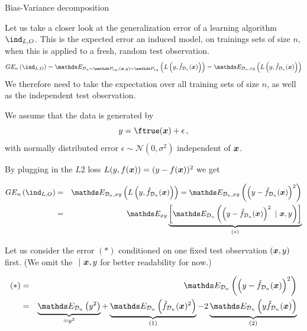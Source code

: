 \begin{vbframe} {Bias-Variance decomposition}

Let us take a closer look at the generalization error of a learning algorithm $\ind_{L, O}$.
This is the expected error an induced model, on trainings sets of size $n$, when this is applied to a fresh, random test observation.
  $$\GEind = \E_{\D_n \sim \Pxy, (\xv, y) \sim \Pxy}\left( L\left(y, \fh_{\D_n}(\xv)\right) \right) = \E_{\D_n, xy}\left( L\left(y, \fh_{\D_n}(\xv)\right) \right)  $$
We therefore need to take the expectation over all training sets of size $n$, as well as the independent test observation.

\lz 

We assume that the data is generated by 
$$
y = \ftrue(\xv) + \epsilon\,,
$$
with normally distributed error $\epsilon \sim \mathcal{N}(0, \sigma^2)$ independent of $\bm{x}$.  

\framebreak 

By plugging in the $L2$ loss $L(y, f(\bm{x})) = (y - f(\bm{x}))^2$ we get

\begin{footnotesize}
\begin{eqnarray*}
\GEind &=& \E_{\D_n, xy}\left( L\left(y, \fh_{\D_n}(\xv)\right)\right) = \E_{\D_n, xy}\left(\left(y - \fh_{\D_n}(\xv)\right)^2\right) \\
&=& \E_{xy}\underbrace{\left[\E_{\D_n}\left(\left(y - \fh_{\D_n}(\xv)\right)^2~|~ \xv, y\right)\right]}_{(*)} 
\end{eqnarray*}
\end{footnotesize}

Let us consider the error $(*)$ conditioned on one fixed test observation $(\bm{x}, y)$ first. (We omit the $~|~\bm{x}, y$ for better readability for now.)

\begin{footnotesize}
\begin{eqnarray*}
(*) &=& \E_{\D_n}\left(\left(y - \fh_{\D_n}(\xv)\right)^2\right)\\
&=& \underbrace{\E_{\D_n}\left(y^2\right)}_{= y^2} + \underbrace{\E_{\D_n}\left(\fh_{\D_n}(\xv)^2\right)}_{(1)}  - 2\underbrace{\E_{\D_n}\left(y\fh_{\D_n}(\xv)\right)}_{(2)} 
\end{eqnarray*}
\end{footnotesize}


\end{vbframe}
